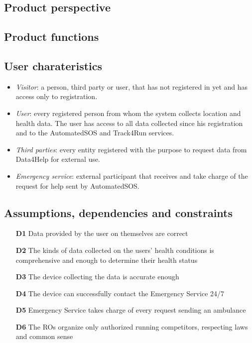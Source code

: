 \subsection{Product perspective}
\subsection{Product functions}
\subsection{User charateristics}
\begin{itemize}
\item	\textit{Visitor}: a person, third party or user, that has not registered in yet and has access only to registration. 
\item	\textit{User}: every registered person from whom the system collects location and health data. The user has access to all data collected since his registration and to the AutomatedSOS and Track4Run services.
\item	\textit{Third parties}: every entity registered with the purpose to request data from Data4Help for external use. 
\item	\textit{Emergency service}: external participant that receives and take charge of the request for help sent by AutomatedSOS. 
\end{itemize}

\subsection{Assumptions, dependencies and constraints}
\begin{itemize}
\item	[\textbf{D1}] Data provided by the user on themselves are correct
\item	[\textbf{D2}] The kinds of data collected on the users’ health conditions is comprehensive and enough to determine their health status
\item	[\textbf{D3}] The device collecting the data is accurate enough 
\item	[\textbf{D4}] The device can successfully contact the Emergency Service 24/7
\item	[\textbf{D5}] Emergency Service takes charge of every request sending an ambulance
\item	[\textbf{D6}] The ROs organize only authorized running competitors, respecting laws and common sense
\end{itemize}

